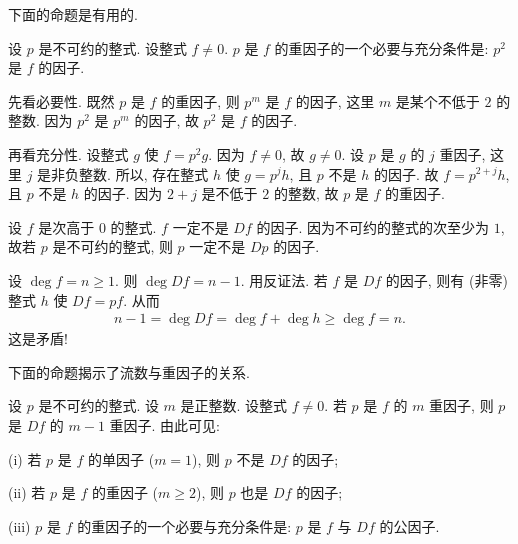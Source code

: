 下面的命题是有用的.

\begin{proposition}
    设 $p$ 是不可约的整式. 设整式 $f \neq 0$. $p$ 是 $f$ 的重因子的一个必要与充分条件是: $p^2$ 是 $f$ 的因子.
\end{proposition}

\begin{pf}
    先看必要性. 既然 $p$ 是 $f$ 的重因子, 则 $p^m$ 是 $f$ 的因子, 这里 $m$ 是某个不低于 $2$ 的整数. 因为 $p^2$ 是 $p^m$ 的因子, 故 $p^2$ 是 $f$ 的因子.

    再看充分性. 设整式 $g$ 使 $f = p^2 g$. 因为 $f \neq 0$, 故 $g \neq 0$. 设 $p$ 是 $g$ 的 $j$ 重因子, 这里 $j$ 是非负整数. 所以, 存在整式 $h$ 使 $g = p^j h$, 且 $p$ 不是 $h$ 的因子. 故 $f = p^{2+j} h$, 且 $p$ 不是 $h$ 的因子. 因为 $2+j$ 是不低于 $2$ 的整数, 故 $p$ 是 $f$ 的重因子.
\end{pf}

\begin{proposition}
    设 $f$ 是次高于 $0$ 的整式. $f$ 一定不是 $Df$ 的因子. 因为不可约的整式的次至少为 $1$, 故若 $p$ 是不可约的整式, 则 $p$ 一定不是 $Dp$ 的因子.
\end{proposition}

\begin{pf}
    设 $\deg f = n \geq 1$. 则 $\deg Df = n - 1$. 用反证法. 若 $f$ 是 $Df$ 的因子, 则有 (非零) 整式 $h$ 使 $Df = pf$. 从而
    \begin{align*}
        n - 1 = \deg Df = \deg f + \deg h \geq \deg f = n.
    \end{align*}
    这是矛盾!
\end{pf}

下面的命题揭示了流数与重因子的关系.

\begin{proposition}
    设 $p$ 是不可约的整式. 设 $m$ 是正整数. 设整式 $f \neq 0$. 若 $p$ 是 $f$ 的 $m$ 重因子, 则 $p$ 是 $Df$ 的 $m-1$ 重因子. 由此可见:

    (i) 若 $p$ 是 $f$ 的单因子 ($m = 1$), 则 $p$ 不是 $Df$ 的因子;

    (ii) 若 $p$ 是 $f$ 的重因子 ($m \geq 2$), 则 $p$ 也是 $Df$ 的因子;

    (iii) $p$ 是 $f$ 的重因子的一个必要与充分条件是: $p$ 是 $f$ 与 $Df$ 的公因子.
\end{proposition}

